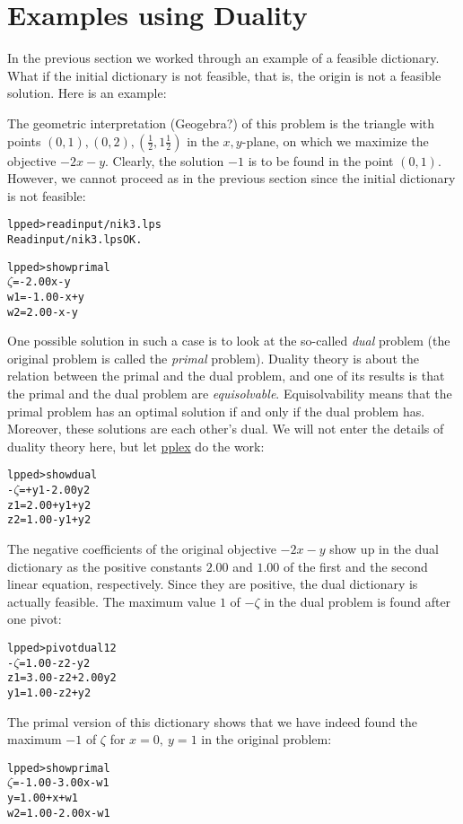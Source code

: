 \documentclass[ukenglish]{nik}
\begin{document}
\section{Examples using Duality}
In the previous section we worked through an example of a feasible dictionary.
What if the initial dictionary is not feasible, that is, the origin is not a
feasible solution. Here is an example:
\begin{alltt}

\end{alltt}
The geometric interpretation (Geogebra?) of this problem is the
triangle with points $(0,1),(0,2),(\frac{1}{2},1\frac{1}{2})$
in the $x,y$-plane, on which we maximize the objective $-2x-y$.
Clearly, the solution $-1$ is to be found in the point $(0,1)$.
However, we cannot proceed as in the previous section since the
initial dictionary is not feasible:
\begin{alltt}
lpped> read input/nik3.lps
Read input/nik3.lps OK.

lpped> show primal
 \(\zeta\) =        - 2.00x - y
w1 = - 1.00 -     x + y
w2 =   2.00 -     x - y
\end{alltt}
One possible solution in such a case is to look at the so-called
\emph{dual} problem (the original problem is called the \emph{primal} problem).
Duality theory is about the relation between the primal and the dual problem,
and one of its results is that the primal and the dual problem are \emph{equisolvable}.
Equisolvability means that the primal problem has an optimal solution if and only if 
the dual problem has. Moreover, these solutions are each other's dual.
We will not enter the details of duality theory here, but let \url{pplex} do the work:
\begin{alltt}
lpped> show dual
-\(\zeta\) =      + y1 - 2.00y2
z1 = 2.00 + y1 +     y2
z2 = 1.00 - y1 +     y2
\end{alltt}
The negative coefficients of the original objective $-2x-y$ show up in the dual
dictionary as the positive constants $2.00$ and $1.00$ of the first and the second 
linear equation, respectively. Since they are positive, the dual dictionary is actually feasible.
The maximum value $1$ of \(-\zeta\) in the dual problem is found after one pivot:
\begin{alltt}
lpped> pivot dual 1 2
-\(\zeta\) = 1.00 - z2 -     y2
z1 = 3.00 - z2 + 2.00y2
y1 = 1.00 - z2 +     y2
\end{alltt}
The primal version of this dictionary shows that we have indeed found the
maximum $-1$ of $\zeta$ for $x=0,~y=1$ in the original problem:
\begin{alltt}
lpped> show primal
 \(\zeta\) = - 1.00 - 3.00x - w1
 y =   1.00 +     x + w1
w2 =   1.00 - 2.00x - w1
\end{alltt}
\end{document}
